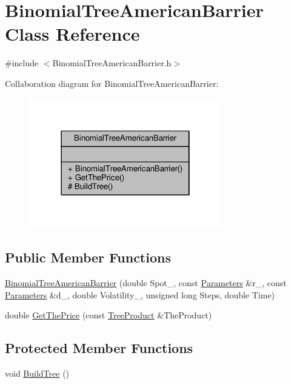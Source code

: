 \hypertarget{classBinomialTreeAmericanBarrier}{}\section{Binomial\+Tree\+American\+Barrier Class Reference}
\label{classBinomialTreeAmericanBarrier}


{\ttfamily \#include $<$Binomial\+Tree\+American\+Barrier.\+h$>$}



Collaboration diagram for Binomial\+Tree\+American\+Barrier\+:
\nopagebreak
\begin{figure}[H]
\begin{center}
\leavevmode
\includegraphics[width=238pt]{classBinomialTreeAmericanBarrier__coll__graph}
\end{center}
\end{figure}
\subsection*{Public Member Functions}
\begin{DoxyCompactItemize}
\item 
\hyperlink{classBinomialTreeAmericanBarrier_aa02aa598a64b7372957117d92f037977}{Binomial\+Tree\+American\+Barrier} (double Spot\+\_\+, const \hyperlink{classParameters}{Parameters} \&r\+\_\+, const \hyperlink{classParameters}{Parameters} \&d\+\_\+, double Volatility\+\_\+, unsigned long Steps, double Time)
\item 
double \hyperlink{classBinomialTreeAmericanBarrier_a6119001ee5107dbd5e19881a47e22fdd}{Get\+The\+Price} (const \hyperlink{classTreeProduct}{Tree\+Product} \&The\+Product)
\end{DoxyCompactItemize}
\subsection*{Protected Member Functions}
\begin{DoxyCompactItemize}
\item 
void \hyperlink{classBinomialTreeAmericanBarrier_adaae6378697610ce4f9bc2be3912aed6}{Build\+Tree} ()
\end{DoxyCompactItemize}


